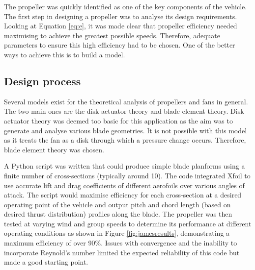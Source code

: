 The propeller was quickly identified as one of the key components of the vehicle. The first step in designing a propeller was to analyse its design requirements. Looking at Equation \ref{eq:e}, it was made clear that propeller efficiency needed maximising to achieve the greatest possible speeds. Therefore, adequate parameters to ensure this high efficiency had to be chosen. One of the better ways to achieve this is to build a model.

\subsection{Design process}

Several models exist for the theoretical analysis of propellers and fans in general. The two main ones are the disk actuator theory and blade element theory. Disk actuator theory was deemed too basic for this application as the aim was to generate and analyse various blade geometries. It is not possible with this model as it treats the fan as a disk through which a pressure change occurs. Therefore, blade element theory was chosen.

A Python script was written that could produce simple blade planforms using a finite number of cross-sections (typically around 10). The code integrated Xfoil to use accurate lift and drag coefficients of different aerofoils over various angles of attack. The script would maximise efficiency for each cross-section at a desired operating point of the vehicle and output pitch and chord length (based on desired thrust distribution) profiles along the blade. The propeller was then tested at varying wind and group speeds to determine its performance at different operating conditions as shown in Figure \ref{fig:jamesresults}, demonstrating a maximum efficiency of over 90\%. Issues with convergence and the inability to incorporate Reynold’s number limited the expected reliability of this code but made a good starting point.


